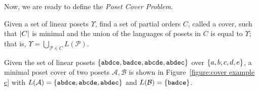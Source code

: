 \documentclass[12pt]{llncs}
\DeclarePairedDelimiter{\set}{\{}{\}}
\DeclarePairedDelimiter{\abs}{\lvert}{\rvert}
\newcommand{\poset}[1]{\mathcal{#1}}
\newcommand{\lang}[1]{L(#1)}
\newcommand{\lin}[1]{\texttt{#1}}
\begin{document}
Now, we are ready to define the \emph{Poset Cover Problem}.

\begin{definition}
    Given a set of linear posets $\Upsilon$, find a set of partial orders $C$, called a cover, such that $\abs{C}$ is minimal and the union of the languages of posets in $C$ is equal to $\Upsilon$; that is, $\Upsilon = \bigcup_{\poset{P} \in C} \lang{\poset{P}}$.
    \label{definition:pcp}
\end{definition}

\begin{example}
    Given the set of linear posets $\set{\lin{abdce},\lin{badce},\lin{abcde},\lin{abdec}}$ over $\set{a,b,c,d,e}$, a minimal poset cover of two posets $\poset{A},\poset{B}$ is shown in Figure~\ref{figure:cover example c} with ${\lang{\poset{A}} = \set{\lin{abdce},\lin{abcde},\lin{abdec}}}$ and ${\lang{\poset{B}} = \set{\lin{badce}}}$.
    \label{example:cover example}
\end{example}
\end{document}
